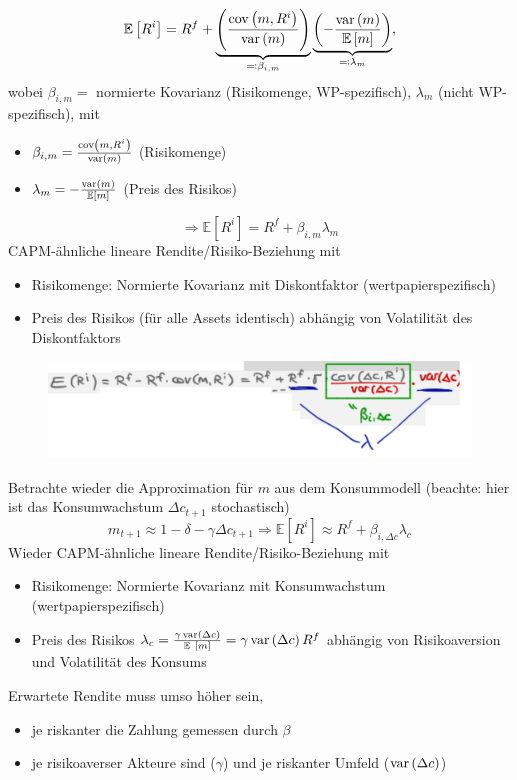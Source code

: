 \documentclass[12pt]{extreport} %
\theoremstyle{named}
\theoremstyle{nnamed}
\theoremstyle{itshape}
\theoremstyle{normal}
\begin{document}
	$$ \mathbb{E}\left[ R^i \right] = R^f + \underbrace{\left( \frac{\operatorname{cov} \left( m, R^i \right)}{\operatorname{var} \left( m \right)} \right)}_{\eqqcolon \beta_{i,m}} \underbrace{\left( - \frac{\operatorname{var} \left( m \right)}{\mathbb{E} \left[ m \right]} \right)}_{\eqqcolon \lambda_{m}},  $$
wobei $\beta_{i,m} =$ normierte Kovarianz (Risikomenge, WP-spezifisch), $\lambda_m$ (nicht WP-spezifisch), mit
\begin{itemize}
	\item $\beta_{i,m} = \frac{\operatorname{cov} \left( m, R^i \right)}{\operatorname{var} \left( m \right)}$ (Risikomenge)
	\item $\lambda_m = - \frac{\operatorname{var} \left( m \right)}{\mathbb{E} \left[ m \right]}$ (Preis des Risikos)
\end{itemize}
$$ \Rightarrow \mathbb{E} \left[ R^i \right] = R^f + \beta_{i, m} \lambda_m $$
CAPM-ähnliche lineare Rendite/Risiko-Beziehung mit
\begin{itemize}
	\item Risikomenge: Normierte Kovarianz mit Diskontfaktor (wertpapierspezifisch)
	\item Preis des Risikos (für alle Assets identisch) abhängig von Volatilität des Diskontfaktors
\end{itemize}

\begin{figure}[h!] \centering
	\includegraphics[scale=0.4]{img/p47-1}
\end{figure}

Betrachte wieder die Approximation für $m$ aus dem Konsummodell (beachte: hier ist das Konsumwachstum $\Delta c_{t+1}$ stochastisch)
	$$ m_{t+1} \approx 1 - \delta - \gamma \Delta c_{t+1} \Rightarrow \mathbb{E} \left[ R^i \right] \approx R^f + \beta_{i, \Delta c} \lambda_c $$
Wieder CAPM-ähnliche lineare Rendite/Risiko-Beziehung mit
\begin{itemize}
	\item Risikomenge: Normierte Kovarianz mit Konsumwachstum (wertpapierspezifisch)
	\item Preis des Risikos $\lambda_c = \frac{\gamma \var \left( \Delta c \right)}{\mathbb{E} \left[ m \right]} = \gamma \var \left( \Delta c \right) R^f$ abhängig von Risikoaversion und Volatilität des Konsums
\end{itemize}
Erwartete Rendite muss umso höher sein,
\begin{itemize}
	\item je riskanter die Zahlung gemessen durch $\beta$
	\item je risikoaverser Akteure sind ($\gamma$) und je riskanter Umfeld ($\operatorname{var} \left( \Delta c \right)$)
\end{itemize}
\end{document}
